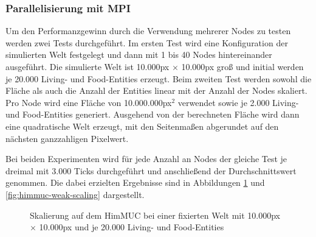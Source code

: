 \documentclass[course=erap]{aspdoc}
\begin{document}
\subsubsection{Parallelisierung mit MPI}
Um den Performanzgewinn durch die Verwendung mehrerer Nodes zu testen werden zwei Tests durchgeführt. Im ersten Test wird eine Konfiguration der simulierten Welt festgelegt und dann mit 1 bis 40 Nodes hintereinander ausgeführt. Die simulierte Welt ist 10.000px $\times$ 10.000px groß und initial werden je 20.000 Living- und Food-Entities erzeugt. Beim zweiten Test werden sowohl die Fläche als auch die Anzahl der Entities linear mit der Anzahl der Nodes skaliert. Pro Node wird eine Fläche von 10.000.000px$^{2}$ verwendet sowie je 2.000 Living- und Food-Entities generiert. Ausgehend von der berechneten Fläche wird dann eine quadratische Welt erzeugt, mit den Seitenmaßen abgerundet auf den nächsten ganzzahligen Pixelwert.

Bei beiden Experimenten wird für jede Anzahl an Nodes der gleiche Test je dreimal mit 3.000 Ticks durchgeführt und anschließend der Durchschnittswert genommen. Die dabei erzielten Ergebnisse sind in Abbildungen \ref{fig:himmuc-strong-scaling} und \ref{fig:himmuc-weak-scaling} dargestellt.

\begin{figure}[t]
\centering
{}
\caption{Skalierung auf dem HimMUC bei einer fixierten Welt mit 10.000px $\times$ 10.000px und je 20.000 Living- und Food-Entities}
\label{fig:himmuc-strong-scaling}
\end{figure}
\end{document}
